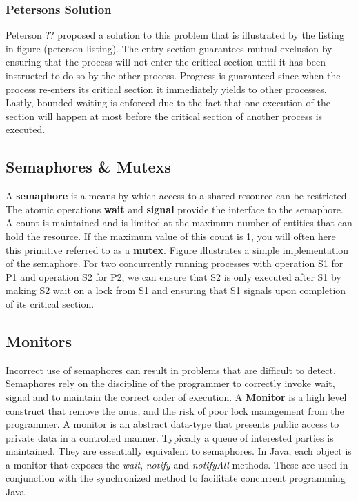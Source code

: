 \documentclass[10pt,a4paper]{article}
\begin{document}
\subsubsection{Petersons Solution}
Peterson ?? proposed a solution to this problem that is illustrated by the listing in figure (peterson listing). The entry section guarantees mutual exclusion by ensuring that the process will not enter the critical section until it has been instructed to do so by the other process. Progress is guaranteed since when the process re-enters its critical section it immediately yields to other processes. Lastly, bounded waiting is enforced due to the fact that one execution of the section will happen at most before the critical section of another process is executed. 
\subsection{Semaphores & Mutexs}
A {\bf semaphore} is a means by which access to a shared resource can be restricted. The atomic operations {\bf wait} and {\bf signal} provide the interface to the semaphore. A count is maintained and is limited at the maximum number of entities that can hold the resource. If the maximum value of this count is 1, you will often here this primitive referred to as a {\bf mutex}. Figure illustrates a simple implementation of the semaphore. For two concurrently running processes with operation S1 for P1 and operation S2 for P2, we can ensure that S2 is only executed after S1 by making S2 wait on a lock from S1 and ensuring that S1 signals upon completion of its critical section. 
\subsection{Monitors}
Incorrect use of semaphores can result in problems that are difficult to detect. Semaphores rely on the discipline of the programmer to correctly invoke wait, signal and to maintain the correct order of execution. A {\bf Monitor} is a high level construct that remove the onus, and the risk of poor lock management from the programmer.  A monitor is an abstract data-type that presents public access to private data in a controlled manner. Typically a queue of interested parties is maintained. They are essentially equivalent to semaphores. In Java, each object is a monitor that exposes the {\it wait}, {\it notify} and {\it notifyAll} methods. These are used in conjunction with the synchronized method to facilitate concurrent programming Java. 
\end{document}
